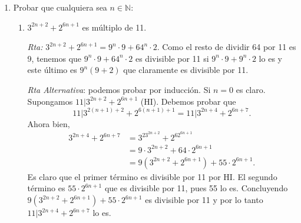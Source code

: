 \documentclass[a4paper,12pt,twoside,spanish,reqno]{amsbook}
\numberwithin{equation}{section}
\newcommand{\rta}{\noindent\textit{Rta: }}
\begin{document}
\begin{enumerate}
\begin{enumerate}
    \rta Falso, contraejemplo: $6\vert12=4\times 3$ pero 6 no divide a 4 ni divide a 3.
    
    \item $a \mid (b+c) \Rightarrow a\mid b$\, \'o \,$a \mid c$.
    
    \rta Falso, contraejemplo: $6\vert 5=1$ per 6 no divide a 5 ni a 1.
    
    \item $a \mid c$\, y \,$b \mid c \Rightarrow a\cdot b \mid c$.
    
    \rta Falso, contraejemplo: $6\vert 12$ y $4\vert 12$ pero 24 no divide a 12.
    
    \item $a \mid c$\, y \,$b \mid c$ $\Rightarrow (a +b) \mid c$.
    
    \rta  Falso, contraejemplo: $2\vert 6$ y $3\vert 6$ pero 5=2+3 no divide a 6.
    
    \item $a$, $b$, $c>0$\, y \,$a=b\cdot c$, entonces  \,$a \ge b$ y $a \ge c$.
    
    \rta  Verdadero, $b\ge1 \Rightarrow a= bc\ge c$ y $ c\ge1 \Rightarrow bc\ge b$.
\end{enumerate}




\item Probar que cualquiera sea $n \in {\mathbb N}$:
\begin{enumerate}
    \item $3^{2n+2}+ 2^{6n+1}$ es múltiplo de 11.
    
    \rta $3^{2n+2} + 2^{6n+1}=9^n \cdot 9+64^n \cdot 2$. Como el resto de dividir 64 por 11 es 9, tenemos que $9^n \cdot 9+64^n \cdot 2$ es divisible por 11 si $9^n \cdot 9+9^n \cdot 2$ lo es y este último es $9^n(9+2)$ que claramente es divisible por 11.
    
\textit{Rta    Alternativa}: podemos probar por inducción. Si $n=0$ es claro. Supongamos $11\vert 3^{2n+2} + 2^{6n+1}$ (HI). Debemos probar que  
$$11\vert 3^{2(n+1)+2} + 2^{6(n+1)+1} = 11\vert 3^{2n+4} + 2^{6n+7}.$$
Ahora bien,
\begin{align*}
    3^{2n+4} + 2^{6n+7} &=   3^23^{2n+2} + 2^62^{6n+1} \\
    &= 9\cdot3^{2n+2} + 64\cdot2^{6n+1} \\
    &=     9(3^{2n+2} + 2^{6n+1}) +55\cdot 2^{6n+1} .
\end{align*}
   Es claro que el primer término es divisible por 11 por HI. El segundo término es $55\cdot 2^{6n+1}$ que es divisible por 11, pues 55 lo es. Concluyendo $9(3^{2n+2} + 2^{6n+1}) +55\cdot 2^{6n+1} $ es divisible por  11 y por lo tanto  $ 11\vert 3^{2n+4} + 2^{6n+7}$ lo es.
    

\end{enumerate}
\end{enumerate}
\end{document}

